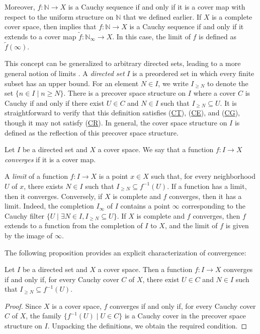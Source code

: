 \documentclass[reqno]{amsart}
\newcommand{\axref}[1]{(\hyperref[ax:#1]{#1})}
\theoremstyle{definition}
\theoremstyle{remark}
\numberwithin{figure}{section}
\begin{document}
Moreover, $f : \mathbb{N} \to X$ is a Cauchy sequence if and only if it is a cover map with respect to the uniform structure on $\mathbb{N}$ that we defined earlier.
If $X$ is a complete cover space, then  implies that $f : \mathbb{N} \to X$ is a Cauchy sequence if and only if it extends to a cover map $\widetilde{f} : \mathbb{N}_\infty \to X$.
In this case, the limit of $f$ is defined as $\widetilde{f}(\infty)$.

This concept can be generalized to arbitrary directed sets, leading to a more general notion of limits \cite{limits}.
A \emph{directed set} $I$ is a preordered set in which every finite subset has an upper bound.
For an element $N \in I$, we write $I_{\geq N}$ to denote the set $\{ n \in I \mid n \geq N \}$.
There is a precover space structure on $I$ where a cover $C$ is Cauchy if and only if there exist $U \in C$ and $N \in I$ such that $I_{\geq N} \subseteq U$.
It is straightforward to verify that this definition satisfies \axref{CT}, \axref{CE}, and \axref{CG}, though it may not satisfy \axref{CR}.
In general, the cover space structure on $I$ is defined as the reflection of this precover space structure.

\begin{defn}
Let $I$ be a directed set and $X$ a cover space.
We say that a function $f : I \to X$ \emph{converges} if it is a cover map.
\end{defn}

A \emph{limit} of a function $f : I \to X$ is a point $x \in X$ such that, for every neighborhood $U$ of $x$, there exists $N \in I$ such that $I_{\geq N} \subseteq f^{-1}(U)$.
If a function has a limit, then it converges.
Conversely, if $X$ is complete and $f$ converges, then it has a limit.
Indeed, the completion $I_\infty$ of $I$ contains a point $\infty$ corresponding to the Cauchy filter $\{ U \mid \exists N \in I, I_{\geq N} \subseteq U \}$.
If $X$ is complete and $f$ converges, then $f$ extends to a function from the completion of $I$ to $X$, and the limit of $f$ is given by the image of $\infty$.

The following proposition provides an explicit characterization of convergence:

\begin{prop}
Let $I$ be a directed set and $X$ a cover space.
Then a function $f : I \to X$ converges if and only if, for every Cauchy cover $C$ of $X$, there exist $U \in C$ and $N \in I$ such that $I_{\geq N} \subseteq f^{-1}(U)$.
\end{prop}
\begin{proof}
Since $X$ is a cover space, $f$ converges if and only if, for every Cauchy cover $C$ of $X$, the family $\{ f^{-1}(U) \mid U \in C \}$ is a Cauchy cover in the precover space structure on $I$.
Unpacking the definitions, we obtain the required condition.
\end{proof}
\end{document}

